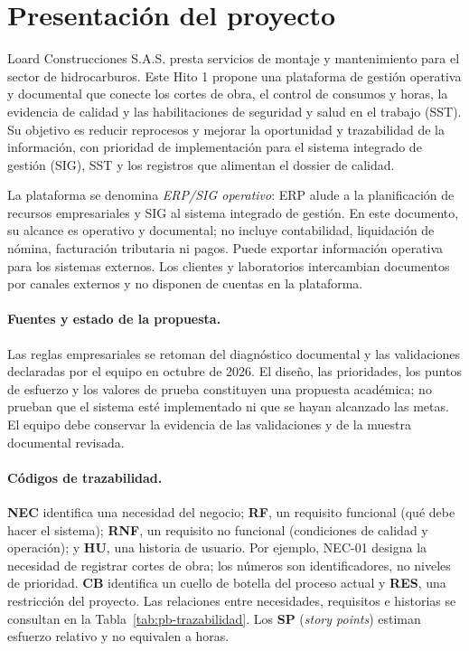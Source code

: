 \documentclass[12pt,letterpaper]{article}
\begin{document}
\section*{Presentación del proyecto}
Loard Construcciones S.A.S. presta servicios de montaje y mantenimiento para el sector de hidrocarburos. Este Hito 1 propone una plataforma de gestión operativa y documental que conecte los cortes de obra, el control de consumos y horas, la evidencia de calidad y las habilitaciones de seguridad y salud en el trabajo (SST). Su objetivo es reducir reprocesos y mejorar la oportunidad y trazabilidad de la información, con prioridad de implementación para el sistema integrado de gestión (SIG), SST y los registros que alimentan el dossier de calidad.

La plataforma se denomina \emph{ERP/SIG operativo}: ERP alude a la planificación de recursos empresariales y SIG al sistema integrado de gestión. En este documento, su alcance es operativo y documental; no incluye contabilidad, liquidación de nómina, facturación tributaria ni pagos. Puede exportar información operativa para los sistemas externos. Los clientes y laboratorios intercambian documentos por canales externos y no disponen de cuentas en la plataforma.

\paragraph{Fuentes y estado de la propuesta.}
Las reglas empresariales se retoman del diagnóstico documental y las validaciones declaradas por el equipo en octubre de 2026. El diseño, las prioridades, los puntos de esfuerzo y los valores de prueba constituyen una propuesta académica; no prueban que el sistema esté implementado ni que se hayan alcanzado las metas. El equipo debe conservar la evidencia de las validaciones y de la muestra documental revisada.

\paragraph{Códigos de trazabilidad.}
\textbf{NEC} identifica una necesidad del negocio; \textbf{RF}, un requisito funcional (qué debe hacer el sistema); \textbf{RNF}, un requisito no funcional (condiciones de calidad y operación); y \textbf{HU}, una historia de usuario. Por ejemplo, NEC-01 designa la necesidad de registrar cortes de obra; los números son identificadores, no niveles de prioridad. \textbf{CB} identifica un cuello de botella del proceso actual y \textbf{RES}, una restricción del proyecto. Las relaciones entre necesidades, requisitos e historias se consultan en la Tabla~\ref{tab:pb-trazabilidad}. Los \textbf{SP} (\emph{story points}) estiman esfuerzo relativo y no equivalen a horas.
\end{document}
